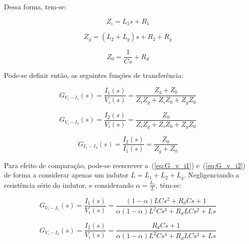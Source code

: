     Dessa forma, tem-se:

    \begin{equation*}
        Z_i = L_1s +R_1
    \end{equation*}

    \begin{equation*}
        Z_g = (L_2 + L_g)s + R_2 + R_g
    \end{equation*}

    \begin{equation*}
        Z_0 = \frac{1}{Cs} + R_d
    \end{equation*}

    Pode-se definir então, as seguintes funções de transferência:

    \begin{equation}
        G_{V_i-I_1}(s) = \frac{I_1(s)}{V_i(s)} = \frac{Z_g + Z_0}{Z_iZ_g + Z_iZ_0 + Z_gZ_0}
        \label{eq:G_v_i1}
    \end{equation}

    \begin{equation}
        G_{V_i-I_2}(s) = \frac{I_2(s)}{V_i(s)} = \frac{Z_0}{Z_iZ_g + Z_iZ_0 + Z_gZ_0}
        \label{eq:G_v_i2}
    \end{equation}

    \begin{equation}
        G_{I_1-I_2}(s) = \frac{I_2(s)}{I_1(s)} = \frac{Z_0}{Z_g + Z_0}
        \label{eq:G_i1_i2}
    \end{equation}

    Para efeito de comparação, pode-se reescrever a~(\ref{eq:G_v_i1})
    e~(\ref{eq:G_v_i2}) de forma a considerar apenas um indutor
    $L = L_1 + L_2 + L_g$. Negligenciando a resistência série do indutor,
    e considerando $\alpha = \frac{L_1}{L}$, têm-se:

    \begin{equation}
        G_{V_i-I_1}(s) = \frac{I_1(s)}{V_i(s)} = \frac{(1-\alpha)LCs^2+R_dCs+1}{\alpha(1-\alpha)L^2Cs^3+R_dLCs^2+Ls}
    \end{equation}

    \begin{equation}
        G_{V_i-I_2}(s) = \frac{I_2(s)}{V_i(s)} = \frac{R_dCs+1}{\alpha(1-\alpha)L^2Cs^3+R_dLCs^2+Ls}
        \label{eq:G_v_i2_2}
    \end{equation}

